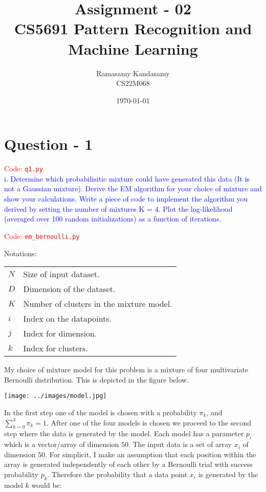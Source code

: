 
\usepackage{bbm}


\title{Assignment - 02\\ CS5691 Pattern Recognition and Machine Learning}
\author{Ramasamy Kandasamy\\ CS22M068}
\date{\today}


\maketitle



\section*{Question - 1}
\textcolor{red}{Code: \texttt{q1.py}}\\
\textcolor{blue}{i. Determine which probabilisitic mixture could have generated this data (It is
not a Gaussian mixture). Derive the EM algorithm for your choice of mixture
and show your calculations. Write a piece of code to implement the algorithm
you derived by setting the number of mixtures K = 4. Plot the log-likelihood
(averaged over 100 random initializations) as a function of iterations.}

\textcolor{red}{Code: \texttt{em\_bernoulli.py}}


Notations:\\
\begin{tabularx}{\linewidth}{lX}
\hline
$N$ & Size of input dataset.\\
$D$ & Dimension of the dataset.\\
$K$ & Number of clusters in the mixture model.\\
$i$ & Index on the datapoints.\\
$j$ & Index for dimension.\\
$k$ & Index for clusters.\\
\hline
\end{tabularx}

My choice of mixture model for this problem is a mixture of four multivariate Bernoulli distribution. This is depicted in the figure below.\\ 


\begin{center}
\texttt{[image: ../images/model.jpg]}	
\end{center}

In the first step one of the model is chosen with a probability $\pi_k$, and $\sum_{k = 0}^{3} \pi_k = 1$. After one of the four models is chosen we proceed to the second step where the data is generated by the model. Each model has a parameter $p_i$ which is a vector/array of dimension $50$. The input data is a set of array $x_i$ of dimension $50$. For simplicit, I make an assumption that each position within the array is generated independently of each other by a Bernoulli trial with success probability $p_k$. Therefore the probability that a data point $x_i$ is generated by the model $k$ would be:

